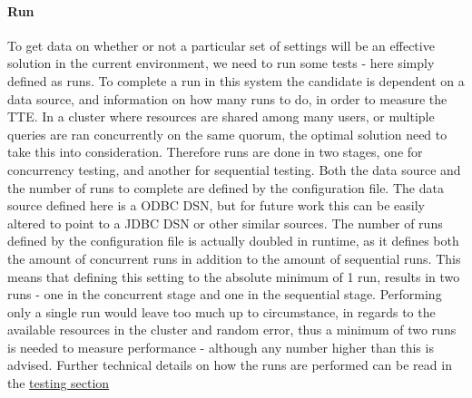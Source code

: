 \documentclass[a4paper,english]{report}
\begin{document}
		\paragraph{Run}
		To get data on whether or not a particular set of settings will be an effective solution in the current environment, we need to run some tests - here simply defined as runs. To complete a run in this system the candidate is dependent on a data source, and information on how many runs to do, in order to measure the TTE. In a cluster where resources are shared among many users, or multiple queries are ran concurrently on the same quorum, the optimal solution need to take this into consideration. Therefore runs are done in two stages, one for concurrency testing, and another for sequential testing. Both the data source and the number of runs to complete are defined by the configuration file. The data source defined here is a ODBC DSN, but for future work this can be easily altered to point to a JDBC DSN or other similar sources. The number of runs defined by the configuration file is actually doubled in runtime, as it defines both the amount of concurrent runs in addition to the amount of sequential runs. This means that defining this setting to the absolute minimum of 1 run, results in two runs - one in the concurrent stage and one in the sequential stage. Performing only a single run would leave too much up to circumstance, in regards to the available resources in the cluster and random error, thus a minimum of two runs is needed to measure performance - although any number higher than this is advised. Further technical details on how the runs are performed can be read in the \hyperref[sec:runs]{testing section}
		\pagebreak
\end{document}
